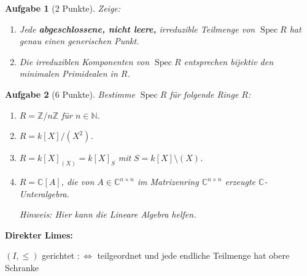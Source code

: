 \documentclass[paper = A4, fontsize=12pt, numbers=noendperiod, chapterprefix=true]{scrbook}
\theoremstyle{break}
\newtheorem{Aufg}{Aufgabe}
\theoremstyle{nonumberbreak}
\theoremstyle{nonumberplain}
\DeclareMathOperator{\Spec}{Spec}
\newcommand{\C}{\mathbb{C}}
\newcommand{\N}{\mathbb{N}}
\newcommand{\Z}{\mathbb{Z}}
\begin{document}
\begin{Aufg}[2 Punkte]
 Zeige:
\begin{enumerate}%
 \item Jede \textbf{abgeschlossene, nicht leere,} irreduzible Teilmenge von $\Spec R$ hat genau einen generischen Punkt.
 \item Die irreduziblen Komponenten von $\Spec R$ entsprechen bijektiv den minimalen Primidealen in $R$.
\end{enumerate}
\end{Aufg}

\begin{Aufg}[6 Punkte]
 Bestimme $\Spec R$ f\"ur folgende Ringe $R$:
\begin{enumerate}%
 \item $R = \Z/n\!\Z$ f\"ur $n\in \N$.
 \item $R = k[X]/(X^2)$.
 \item $R = k[X]_{(X)} = k[X]_S$ mit $S = k[X]\setminus(X)$.
 \item $R = \C[A]$, die von $A\in \C^{n\times n}$ im Matrizenring $\C^{n\times n}$ erzeugte $\C$-Unteralgebra.
 
 \textit{Hinweis: Hier kann die Lineare Algebra helfen.}
\end{enumerate}
\end{Aufg}

\textbf{Direkter Limes:}

$(I, \le)$ gerichtet $:\Leftrightarrow$ teilgeordnet und jede endliche Teilmenge hat obere Schranke
\end{document}
